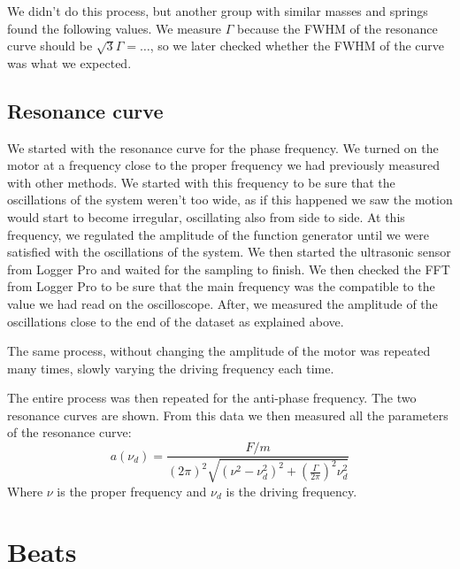 \documentclass{article}
\begin{document}
We didn't do this process, but another group with similar masses and springs found the following values. 
We measure $\Gamma$ because the FWHM of the resonance curve should be $\sqrt 3 \Gamma = \dots$, so we later checked whether the FWHM of the curve was what we expected.


\subsection{Resonance curve}
We started with the resonance curve for the phase frequency. We turned on the motor at a frequency close to the proper frequency we had previously measured with other methods. We started with this frequency to be sure that the oscillations of the system weren't too wide, as if this happened we saw the motion would start to become irregular, oscillating also from side to side. At this frequency, we regulated the amplitude of the function generator until we were satisfied with the oscillations of the system. We then started the ultrasonic sensor from Logger Pro and waited for the sampling to finish. We then checked the FFT from Logger Pro to be sure that the main frequency was the compatible to the value we had read on the oscilloscope. After, we measured the amplitude of the oscillations close to the end of the dataset as explained above. 

The same process, without changing the amplitude of the motor was repeated many times, slowly varying the driving frequency each time. 

The entire process was then repeated for the anti-phase frequency. The two resonance curves are shown. 
From this data we then measured all the parameters of the resonance curve: 
\begin{equation}
    a (\nu_d) = \frac{F/m}{  (2\pi)^2
                \sqrt{( \nu^2 - \nu_d^2 )^2 +
                \left ( \frac{\Gamma}{2\pi} \right )^2 \nu_d^2}}
\end{equation}  
Where $\nu$ is the proper frequency and $\nu_d$ is the driving frequency.

\section{Beats}
\end{document}
